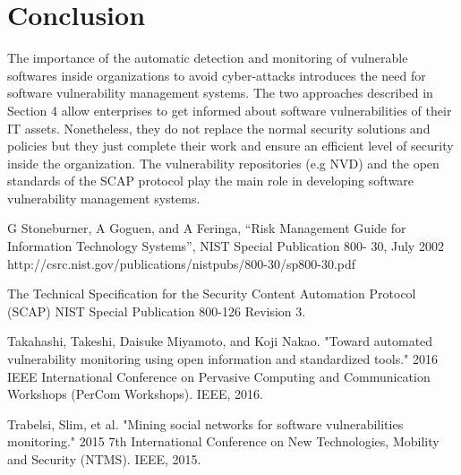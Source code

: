 \documentclass{llncs}
\begin{document}
 \newpage  
\section{Conclusion}

\par The importance of the automatic detection and monitoring of vulnerable softwares inside organizations to avoid cyber-attacks introduces the need for software vulnerability management systems. The two approaches described in Section 4 allow enterprises to get informed about software vulnerabilities of their IT assets. Nonetheless, they do not replace the normal security solutions and policies but they just complete their work and ensure an efficient level of security inside the organization. The vulnerability repositories (e.g NVD) and the open standards of the SCAP protocol play the main role in developing software vulnerability management systems.   


\newpage
\begin{thebibliography}{[MT1]}

%


G Stoneburner, A Goguen, and A Feringa, “Risk Management Guide
for Information Technology Systems”, NIST Special Publication 800-
30, July 2002
http://csrc.nist.gov/publications/nistpubs/800-30/sp800-30.pdf

The Technical Specification for the
Security Content Automation Protocol (SCAP)
NIST Special Publication 800-126
Revision 3.

Takahashi, Takeshi, Daisuke Miyamoto, and Koji Nakao. "Toward automated vulnerability monitoring using open information and standardized tools." 2016 IEEE International Conference on Pervasive Computing and Communication Workshops (PerCom Workshops). IEEE, 2016.

Trabelsi, Slim, et al. "Mining social networks for software vulnerabilities monitoring." 2015 7th International Conference on New Technologies, Mobility and Security (NTMS). IEEE, 2015.
%
\end{thebibliography}
\end{document}
